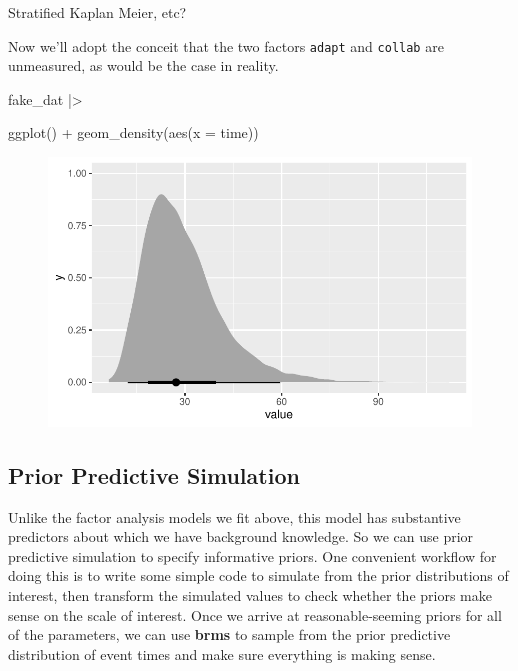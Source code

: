 \documentclass[
  letterpaper,
  DIV=11,
  numbers=noendperiod]{scrreprt}
\newenvironment{Shaded}{\begin{snugshade}}{\end{snugshade}}
\newcommand{\AttributeTok}[1]{\textcolor[rgb]{0.40,0.45,0.13}{#1}}
\newcommand{\FunctionTok}[1]{\textcolor[rgb]{0.28,0.35,0.67}{#1}}
\newcommand{\NormalTok}[1]{\textcolor[rgb]{0.00,0.23,0.31}{#1}}
\newcommand{\SpecialCharTok}[1]{\textcolor[rgb]{0.37,0.37,0.37}{#1}}
\begin{document}
Stratified Kaplan Meier, etc?

Now we'll adopt the conceit that the two factors \texttt{adapt} and
\texttt{collab} are unmeasured, as would be the case in reality.

\begin{Shaded}
\begin{Highlighting}[]
\NormalTok{fake\_dat }\SpecialCharTok{|\textgreater{}}

    \FunctionTok{ggplot}\NormalTok{() }\SpecialCharTok{+} 
    \FunctionTok{geom\_density}\NormalTok{(}\FunctionTok{aes}\NormalTok{(}\AttributeTok{x =}\NormalTok{ time))}
\end{Highlighting}
\end{Shaded}

\begin{figure}[H]

{\centering \includegraphics{./bayesian-cfa_files/figure-pdf/unnamed-chunk-24-1.pdf}

}

\end{figure}

\hypertarget{prior-predictive-simulation}{%
\subsection*{Prior Predictive
Simulation}\label{prior-predictive-simulation}}

Unlike the factor analysis models we fit above, this model has
substantive predictors about which we have background knowledge. So we
can use prior predictive simulation to specify informative priors. One
convenient workflow for doing this is to write some simple code to
simulate from the prior distributions of interest, then transform the
simulated values to check whether the priors make sense on the scale of
interest. Once we arrive at reasonable-seeming priors for all of the
parameters, we can use \textbf{brms} to sample from the prior predictive
distribution of event times and make sure everything is making sense.
\end{document}
